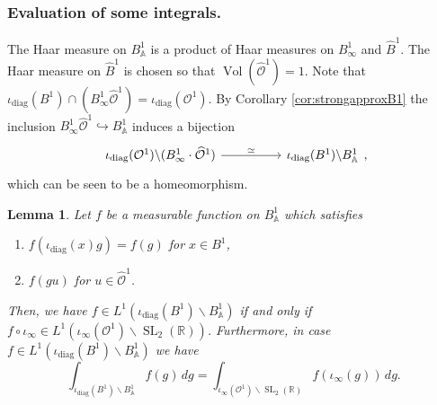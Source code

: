 \documentclass{article}
\newtheorem{lem}{Lemma}[section]
\theoremstyle{named}
\newcommand{\A}{\mathbb{A}}
\newcommand{\R}{\mathbb{R}}
\renewcommand{\O}{\mathcal{O}}
\DeclareMathOperator{\SL}{SL}
\DeclareMathOperator{\vol}{Vol}
\DeclareMathOperator{\diag}{diag}
\begin{document}
\subsubsection{Evaluation of some integrals.}\label{subsubsec:haarmeasureB1}
The Haar measure on $B_\A^1$ is a product of Haar measures on $B_\infty^1$ and $\widehat{B}^1$. The Haar measure on $\widehat{B}^1$ is chosen so that $\vol(\widehat{\O}^1) = 1$. Note that $\iota_{\diag}(B^1)\cap (B^1_\infty \widehat{\O}^1) = \iota_{\diag}(\O^1)$. By Corollary \ref{cor:strongapproxB1} the inclusion $B_\infty^1 \widehat{\O}^1 \hookrightarrow B_\A^1$ induces a bijection
\begin{equation}\label{eq:identificationofhomogeneouspaces}
\begin{tikzcd}
\iota_{\diag}(\O^1)\backslash (B^1_\infty \cdot \widehat{\O}^1) \arrow[rr, "\simeq"] &  & \iota_{\diag}(B^1)\backslash B_\A^1
\end{tikzcd},
\end{equation}
which can be seen to be a homeomorphism. 
\begin{lem}\label{lem:computationadelicintegralB1}
Let $f$ be a measurable function on $B_\A^1$ which satisfies
\begin{enumerate}
    \item [i)] $f(\iota_{\diag}(x)g) = f(g)$ for $x \in B^1$, 
    \item [ii)] $f(gu)$ for $u \in \widehat{\O}^1$. 
\end{enumerate}
Then, we have $f \in L^1(\iota_{\diag}(B^1)\backslash B_\A^1)$ if and only if $f \circ \iota_\infty \in L^1(\iota_\infty(\O^1) \backslash \SL_2(\R))$. Furthermore, in case $f \in L^1(\iota_{\diag}(B^1)\backslash B_\A^1)$ we have
\begin{equation}\label{eq:integralshomogeneousspacesB1}
    \int_{\iota_{\diag}(B^1)\backslash B_\A^1} f(g) \, dg = \int_{\iota_\infty(\O^1) \backslash \SL_2(\R)} f(\iota_\infty(g)) \, dg.
\end{equation}
\end{lem}
\end{document}
